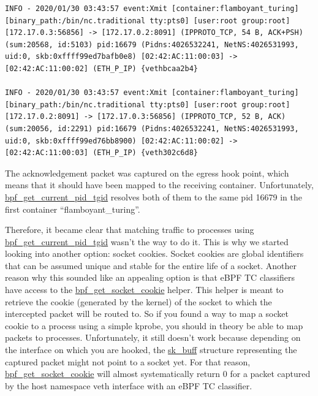 \begin{lstlisting}[language={},style=logStyle,caption={Example of two network packets that eBPF mistakenly mapped to the same process and container.},label={lst:ProcessLevelNetworkSecurityMonitoring:traffic1}]
INFO - 2020/01/30 03:43:57 event:Xmit [container:flamboyant_turing] [binary_path:/bin/nc.traditional tty:pts0] [user:root group:root] [172.17.0.3:56856] -> [172.17.0.2:8091] (IPPROTO_TCP, 54 B, ACK+PSH) (sum:20568, id:5103) pid:16679 (Pidns:4026532241, NetNS:4026531993, uid:0, skb:0xffff99ed7bafb0e8) [02:42:AC:11:00:03] -> [02:42:AC:11:00:02] (ETH_P_IP) {vethbcaa2b4}

INFO - 2020/01/30 03:43:57 event:Xmit [container:flamboyant_turing] [binary_path:/bin/nc.traditional tty:pts0] [user:root group:root] [172.17.0.2:8091] -> [172.17.0.3:56856] (IPPROTO_TCP, 52 B, ACK) (sum:20056, id:2291) pid:16679 (Pidns:4026532241, NetNS:4026531993, uid:0, skb:0xffff99ed76bb8900) [02:42:AC:11:00:02] -> [02:42:AC:11:00:03] (ETH_P_IP) {veth302c6d8}
\end{lstlisting}

The acknowledgement packet was captured on the egress hook point, which means that it should have been mapped to the receiving container. Unfortunately, \url{bpf_get_current_pid_tgid} resolves both of them to the same pid 16679 in the first container “flamboyant\_turing”.

Therefore, it became clear that matching traffic to processes using \url{bpf_get_current_pid_tgid} wasn’t the way to do it. This is why we started looking into another option: socket cookies. Socket cookies are global identifiers that can be assumed unique and stable for the entire life of a socket. Another reason why this sounded like an appealing option is that eBPF TC classifiers have access to the \url{bpf_get_socket_cookie} helper. This helper is meant to retrieve the cookie (generated by the kernel) of the socket to which the intercepted packet will be routed to. So if you found a way to map a socket cookie to a process using a simple kprobe, you should in theory be able to map packets to processes. Unfortunately, it still doesn’t work because depending on the interface on which you are hooked, the \url{sk_buff} structure representing the captured packet might not point to a socket yet. For that reason, \url{bpf_get_socket_cookie} will almost systematically return 0 for a packet captured by the host namespace veth interface with an eBPF TC classifier.

